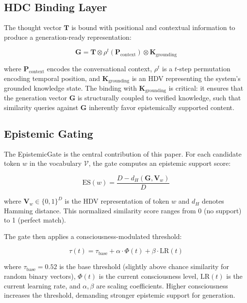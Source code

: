 \documentclass[12pt,a4paper]{article}
\begin{document}
\subsection{HDC Binding Layer}

The thought vector $\mathbf{T}$ is bound with positional and contextual information to produce a generation-ready representation:

\begin{equation}
\mathbf{G} = \mathbf{T} \otimes \rho^t(\mathbf{P}_{\text{context}}) \otimes \mathbf{K}_{\text{grounding}}
\end{equation}

where $\mathbf{P}_{\text{context}}$ encodes the conversational context, $\rho^t$ is a $t$-step permutation encoding temporal position, and $\mathbf{K}_{\text{grounding}}$ is an HDV representing the system's grounded knowledge state. The binding with $\mathbf{K}_{\text{grounding}}$ is critical: it ensures that the generation vector $\mathbf{G}$ is structurally coupled to verified knowledge, such that similarity queries against $\mathbf{G}$ inherently favor epistemically supported content.

\subsection{Epistemic Gating}

The EpistemicGate is the central contribution of this paper. For each candidate token $w$ in the vocabulary $\mathcal{V}$, the gate computes an epistemic support score:

\begin{equation}
\text{ES}(w) = \frac{D - d_H(\mathbf{G}, \mathbf{V}_w)}{D}
\label{eq:epistemic-support}
\end{equation}

where $\mathbf{V}_w \in \{0,1\}^D$ is the HDV representation of token $w$ and $d_H$ denotes Hamming distance. This normalized similarity score ranges from 0 (no support) to 1 (perfect match).

The gate then applies a consciousness-modulated threshold:

\begin{equation}
\tau(t) = \tau_{\text{base}} + \alpha \cdot \Phi(t) + \beta \cdot \text{LR}(t)
\label{eq:threshold}
\end{equation}

where $\tau_{\text{base}} = 0.52$ is the base threshold (slightly above chance similarity for random binary vectors), $\Phi(t)$ is the current consciousness level, $\text{LR}(t)$ is the current learning rate, and $\alpha, \beta$ are scaling coefficients. Higher consciousness increases the threshold, demanding stronger epistemic support for generation.
\end{document}
